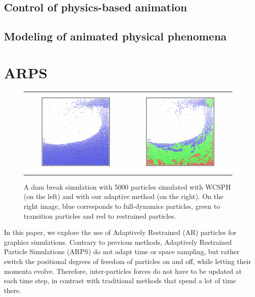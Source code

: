 \documentclass[11pt, oneside, a4paper]{memoir}
\begin{document}
\section{Control of physics-based animation}

\section{Modeling of animated physical phenomena}


\chapter{ARPS}
\label{chap:arps}

\begin{figure}[!h]
    \begin{tabular}{cc}
        \includegraphics[width=0.4\linewidth]{images/arps-vriphys2013/ReposSPHClassique1.jpg} &
        \includegraphics[width=0.4\linewidth]{images/arps-vriphys2013/ReposSPHARPSColor1.jpg}
    \end{tabular}
 \centering
 \caption{ A dam break simulation with 5000 particles simulated with WCSPH (on the left)
 and with our adaptive method (on the right). On the right image, blue corresponds to full-dynamics particles, green to transition particles and red to restrained particles.}
\label{fig:teaser}
\end{figure}

In this paper, we explore the use of Adaptively Restrained (AR) particles for graphics simulations. Contrary to previous methods,
Adaptively Restrained Particle Simulations (ARPS) do not adapt time or space sampling, but rather switch the positional degrees of freedom of particles on and off, while letting their momenta evolve. Therefore, inter-particles forces do not have to be updated at each time step, in contrast with traditional methods that spend a lot of time there.
\end{document}
